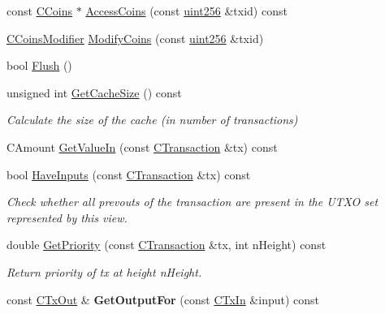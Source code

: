 \begin{DoxyCompactItemize}
\item 
const \mbox{\hyperlink{class_c_coins}{C\+Coins}} $\ast$ \mbox{\hyperlink{class_c_coins_view_cache_a8e5341e8b01233949d6170dd4d1fd75d}{Access\+Coins}} (const \mbox{\hyperlink{classuint256}{uint256}} \&txid) const
\item 
\mbox{\hyperlink{class_c_coins_modifier}{C\+Coins\+Modifier}} \mbox{\hyperlink{class_c_coins_view_cache_ab67c0d489873ed735c4fc52aa66f0830}{Modify\+Coins}} (const \mbox{\hyperlink{classuint256}{uint256}} \&txid)
\item 
bool \mbox{\hyperlink{class_c_coins_view_cache_ac9888d4feaa46666d03871cd7cd1c01d}{Flush}} ()
\item 
\mbox{\label{class_c_coins_view_cache_a937e30d96fd43e403c862b193cf5b942}} 
unsigned int \mbox{\hyperlink{class_c_coins_view_cache_a937e30d96fd43e403c862b193cf5b942}{Get\+Cache\+Size}} () const
\begin{DoxyCompactList}\small\item\em Calculate the size of the cache (in number of transactions) \end{DoxyCompactList}\item 
C\+Amount \mbox{\hyperlink{class_c_coins_view_cache_a1a8cd6069fba96939ffcb1bd36ffb921}{Get\+Value\+In}} (const \mbox{\hyperlink{class_c_transaction}{C\+Transaction}} \&tx) const
\item 
\mbox{\label{class_c_coins_view_cache_a5b1abd71c95dc7be2523b9c28839ec29}} 
bool \mbox{\hyperlink{class_c_coins_view_cache_a5b1abd71c95dc7be2523b9c28839ec29}{Have\+Inputs}} (const \mbox{\hyperlink{class_c_transaction}{C\+Transaction}} \&tx) const
\begin{DoxyCompactList}\small\item\em Check whether all prevouts of the transaction are present in the U\+T\+XO set represented by this view. \end{DoxyCompactList}\item 
\mbox{\label{class_c_coins_view_cache_a111d5a94709eaccd57bafe6ab1d938af}} 
double \mbox{\hyperlink{class_c_coins_view_cache_a111d5a94709eaccd57bafe6ab1d938af}{Get\+Priority}} (const \mbox{\hyperlink{class_c_transaction}{C\+Transaction}} \&tx, int n\+Height) const
\begin{DoxyCompactList}\small\item\em Return priority of tx at height n\+Height. \end{DoxyCompactList}\item 
\mbox{\label{class_c_coins_view_cache_a54a0de51586fa92d83cfa321fb8936c5}} 
const \mbox{\hyperlink{class_c_tx_out}{C\+Tx\+Out}} \& {\bfseries Get\+Output\+For} (const \mbox{\hyperlink{class_c_tx_in}{C\+Tx\+In}} \&input) const
\end{DoxyCompactItemize}
